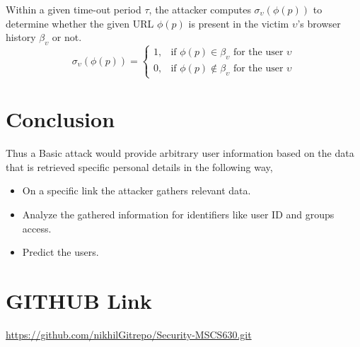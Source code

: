 \documentclass{article}
\begin{document}
\begin{enumerate}
	
	Within a given time-out period $\tau$, the attacker computes $\sigma_\upsilon(\phi(p))$ to determine whether the given URL $\phi(p)$ is present in the victim $\upsilon$'s browser history $\beta_\upsilon$ or not.
	\begin{equation*}
	\sigma_\upsilon(\phi(p))=
\begin{cases}
1, & \text{if } \phi(p) \in \beta_\upsilon \text{ for the user }\upsilon \\
0, & \text{if } \phi(p) \notin \beta_\upsilon \text{ for the user }\upsilon
\end{cases}
	\end{equation*}
\end{enumerate}
\section*{Conclusion}
Thus a Basic attack would provide arbitrary user information based on the data that is retrieved specific personal details in the following way,\\
\begin{itemize}
\item On a specific link the attacker gathers relevant data.\\
\item Analyze the gathered information for identifiers like user ID and groups access.\\
\item Predict the users.\\
\end{itemize}
\section*{GITHUB Link}
\url{https://github.com/nikhilGitrepo/Security-MSCS630.git}
\end{document}
